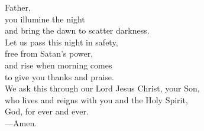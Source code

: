 \prayer


\begin{prayerverse}
Father,\\
you illumine the night\\
and bring the dawn to scatter darkness.\\
Let us pass this night in safety,\\
free from Satan’s power,\\
and rise when morning comes\\
to give you thanks and praise.\\
We ask this through our Lord Jesus Christ, your Son,\\
who lives and reigns with you and the Holy Spirit,\\
God, for ever and ever.\\
{\color{red}---\thinspace}Amen.
\end{prayerverse}

